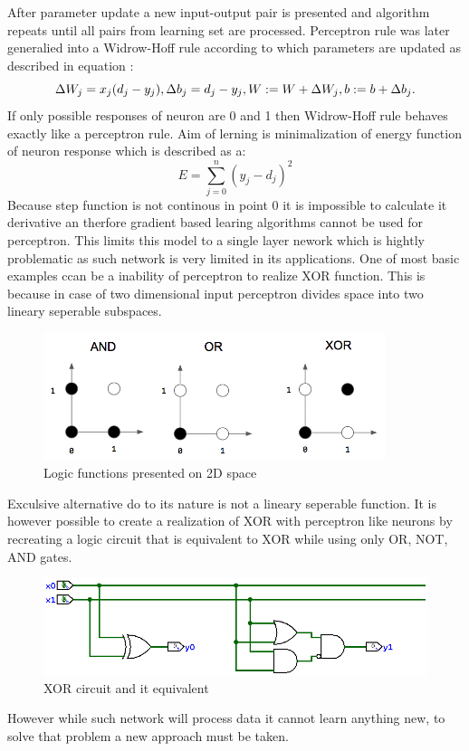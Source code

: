 After parameter update a new input-output pair is presented and algorithm repeats until all 
pairs from learning set are processed.
Perceptron rule was later generalied into a Widrow-Hoff rule according to which parameters are 
updated as described in equation :
\begin{equation}
	\Delta W_{j} = x_{j}(d_{j}-y_{j}),\\
	\Delta b_{j} = d_{j} - y_{j},\\
	W :=  W + \Delta W_{j},\\
	b := b + \Delta b_{j}.
\end{equation}
If only possible responses of neuron are 0 and 1 then Widrow-Hoff rule behaves exactly like a
perceptron rule.
Aim of lerning is minimalization of energy function of neuron response which is described as a:
\begin{equation}
	E = \sum_{j=0}^{n}(y_{j}-d_{j})^{2}
\end{equation}
Because step function is not continous in point 0 it is impossible to calculate it derivative
an therfore gradient based learing algorithms cannot be used for perceptron.
This limits this model to a single layer nework which is hightly problematic as such network
is very limited in its applications.
One of most basic examples ccan be a inability of perceptron to realize XOR function.
This is because in case of two dimensional input perceptron divides space into two lineary
seperable subspaces.
\begin{figure}[h] 
	\centering
	\includegraphics[width=10cm]{res/logic_neuron}
	\caption{Logic functions presented on 2D space}
	\label{fig:logic_neuron}
\end{figure}
Exculsive alternative do to its nature is not a lineary seperable function. It is however
possible to create a realization of XOR with perceptron like neurons by recreating a logic
circuit that is equivalent to XOR while using only OR, NOT, AND gates.
\begin{figure}[ht] 
	\centering
	\includegraphics[width=\textwidth]{res/xor_circ}
	\caption{XOR circuit and it equivalent}
	\label{fig:xor_circ}
\end{figure}
However while such network will process data it cannot learn anything new, to solve that 
problem a new approach must be taken.

